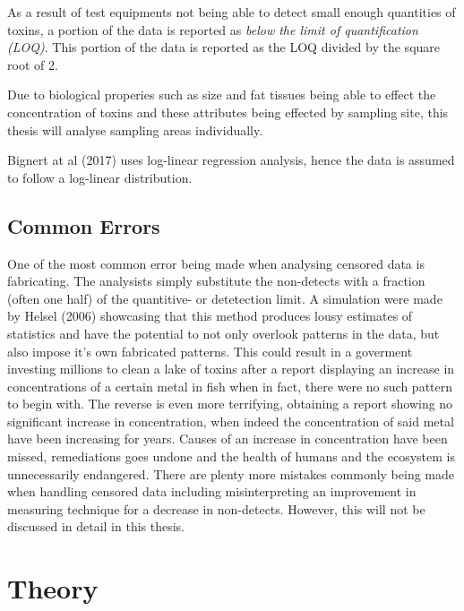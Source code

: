 \documentclass[]{article}
\begin{document}
As a result of test equipments not being able to detect small enough
quantities of toxins, a portion of the data is reported as \emph{below
the limit of quantification (LOQ)}. This portion of the data is reported
as the LOQ divided by the square root of 2.

Due to biological properies such as size and fat tissues being able to
effect the concentration of toxins and these attributes being effected
by sampling site, this thesis will analyse sampling areas individually.

Bignert at al (2017) uses log-linear regression analysis, hence the data
is assumed to follow a log-linear distribution.

\hypertarget{common-errors}{%
\subsection{Common Errors}\label{common-errors}}

One of the most common error being made when analysing censored data is
fabricating. The analysists simply substitute the non-detects with a
fraction (often one half) of the quantitive- or detetection limit. A
simulation were made by Helsel (2006) showcasing that this method
produces lousy estimates of statistics and have the potential to not
only overlook patterns in the data, but also impose it's own fabricated
patterns. This could result in a goverment investing millions to clean a
lake of toxins after a report displaying an increase in concentrations
of a certain metal in fish when in fact, there were no such pattern to
begin with. The reverse is even more terrifying, obtaining a report
showing no significant increase in concentration, when indeed the
concentration of said metal have been increasing for years. Causes of an
increase in concentration have been missed, remediations goes undone and
the health of humans and the ecosystem is unnecessarily endangered.
There are plenty more mistakes commonly being made when handling
censored data including misinterpreting an improvement in measuring
technique for a decrease in non-detects. However, this will not be
discussed in detail in this thesis.

\hypertarget{theory}{%
\section{Theory}\label{theory}}
\end{document}
